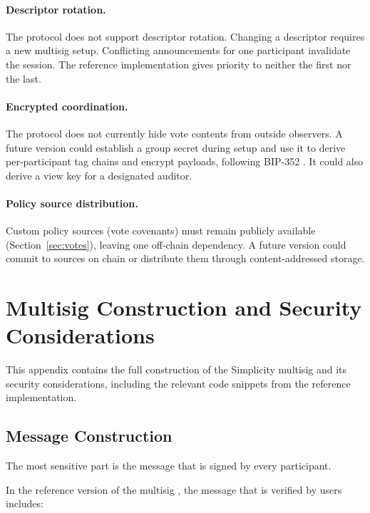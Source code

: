 \documentclass[11pt]{article}
\begin{document}
    \paragraph{Descriptor rotation.}
    The protocol does not support descriptor rotation. Changing a descriptor requires a new multisig setup. Conflicting announcements for one participant invalidate the session. The reference implementation gives priority to neither the first nor the last.

    \paragraph{Encrypted coordination.}
    The protocol does not currently hide vote contents from outside observers. A future version could establish a group secret during setup and use it to derive per-participant tag chains and encrypt payloads, following BIP-352 \cite{bip352}. It could also derive a view key for a designated auditor.

    \paragraph{Policy source distribution.}
    Custom policy sources (vote covenants) must remain publicly available (Section~\ref{sec:votes}), leaving one off-chain dependency. A future version could commit to sources on chain or distribute them through content-addressed storage.

    \appendix


    \section{Multisig Construction and Security Considerations}
    \label{app:construction}

    This appendix contains the full construction of the Simplicity multisig and its security considerations, including the relevant code snippets from the reference implementation.

    \subsection{Message Construction}
    \label{app:message}

    The most sensitive part is the message that is signed by every participant.

    In the reference version of the multisig \cite{native-multisig-multisig}, the message that is verified by users includes:
\end{document}
